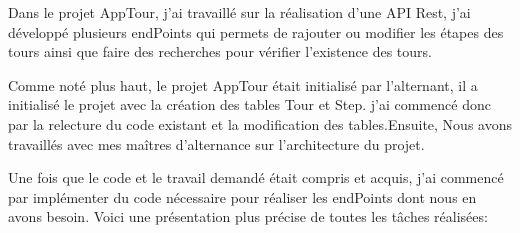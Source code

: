 \documentclass[12pt]{article}
\begin{document}
Dans le projet AppTour, j'ai travaillé sur la réalisation d'une API Rest, j'ai développé plusieurs endPoints qui permets de rajouter ou modifier les étapes des tours ainsi que faire des recherches pour vérifier l’existence des tours. 

Comme noté plus haut, le projet AppTour était initialisé par l'alternant, il a initialisé le projet avec la création des tables Tour et Step. j'ai commencé donc par la relecture du code existant et la modification des tables.Ensuite, Nous avons travaillés avec mes maîtres d'alternance sur l'architecture du projet.

Une fois que le code et le travail demandé était compris et acquis, j'ai commencé par implémenter du code nécessaire pour réaliser les endPoints dont nous en avons besoin. Voici une présentation plus précise de toutes les tâches réalisées:   
\end{document}
